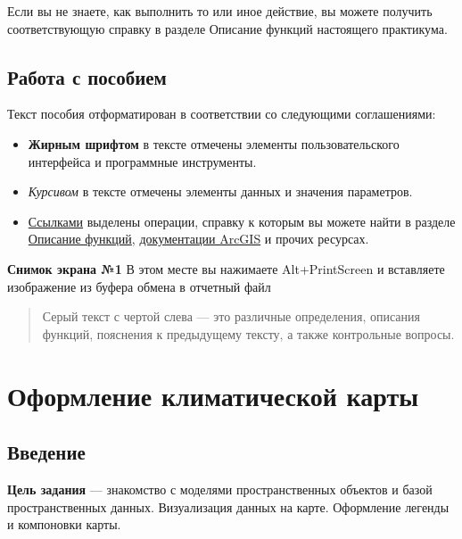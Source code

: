 \documentclass[]{book}
\providecommand{\tightlist}{%
  \setlength{\itemsep}{0pt}\setlength{\parskip}{0pt}}
\theoremstyle{definition}
\theoremstyle{definition}
\theoremstyle{definition}
\theoremstyle{remark}
\begin{document}
Если вы не знаете, как выполнить то или иное действие, вы можете
получить соответствующую справку в разделе Описание функций настоящего
практикума.

\hypertarget{--}{%
\section*{Работа с пособием}\label{--}}

Текст пособия отформатирован в соответствии со следующими соглашениями:

\begin{itemize}
\tightlist
\item
  \textbf{Жирным шрифтом} в тексте отмечены элементы пользовательского
  интерфейса и программные инструменты.
\item
  \emph{Курсивом} в тексте отмечены элементы данных и значения
  параметров.
\item
  \href{}{Ссылками} выделены операции, справку к которым вы можете найти
  в разделе \href{}{Описание функций},
  \href{https://desktop.arcgis.com/ru/documentation/}{документации
  ArcGIS} и прочих ресурсах.
\end{itemize}

\textbf{Снимок экрана №1} В этом месте вы нажимаете Alt+PrintScreen и
вставляете изображение из буфера обмена в отчетный файл

\begin{quote}
Серый текст с чертой слева --- это различные определения, описания
функций, пояснения к предыдущему тексту, а также контрольные вопросы.
\end{quote}

\hypertarget{map-design-climates}{%
\chapter{Оформление климатической карты}\label{map-design-climates}}

\hypertarget{map-design-climates-intro}{%
\section{Введение}\label{map-design-climates-intro}}

\textbf{Цель задания} --- знакомство с моделями пространственных
объектов и базой пространственных данных. Визуализация данных на карте.
Оформление легенды и компоновки карты.
\end{document}
